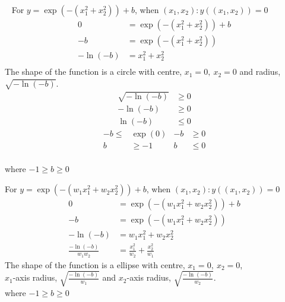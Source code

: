 \documentclass[12pt]{article}
\newenvironment{solution}[2][Solution]{\begin{trivlist}
\item[\hskip \labelsep {\bfseries #1}]}{\end{trivlist}}
\begin{document}
\begin{solution}{}~
For $y=\exp(-(x_1^2+x_2^2))+b$, when $(x_1,x_2):y((x_1,x_2))=0$
\begin{align*}
0&=\exp(-(x_1^2+x_2^2))+b\\
-b&=\exp(-(x_1^2+x_2^2))\\
-\ln(-b)&=x_1^2+x_2^2\\
\end{align*}
The shape of the function is a circle with centre, $x_1=0,\ x_2=0$ and radius, $\sqrt{-\ln(-b)}$.\\
\begin{align*}
\sqrt{-\ln(-b)}&\geq0\\
-\ln(-b)&\geq0\\
\ln(-b)&\leq0
\end{align*}
$$
\begin{array}{rlrl}
-b\leq&\exp(0) & -b&\geq0\\
b&\geq-1 & b&\leq0\\
\end{array}
$$
\begin{center}
where $-1\geq b\geq0$
\end{center}

For $y=\exp(-(w_1x_1^2+w_2x_2^2))+b$, when $(x_1,x_2):y((x_1,x_2))=0$
\begin{align*}
0&=\exp(-(w_1x_1^2+w_2x_2^2))+b\\
-b&=\exp(-(w_1x_1^2+w_2x_2^2))\\
-\ln(-b)&=w_1x_1^2+w_2x_2^2\\
\frac{-\ln(-b)}{w_1w_2}&=\frac{x_1^2}{w_2}+\frac{x_2^2}{w_1}
\end{align*}
The shape of the function is a ellipse with centre, $x_1=0,\ x_2=0$,\\ $x_1$-axis radius, $\sqrt{\frac{-\ln(-b)}{w_1}}$ and $x_2$-axis radius, $\sqrt{\frac{-\ln(-b)}{w_2}}$.\\
where $-1\geq b\geq0$
\end{solution}
\end{document}
